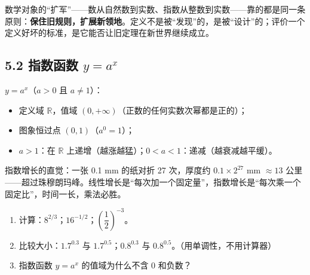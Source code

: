 \documentclass[UTF8,a4paper,11pt]{ctexart}
\begin{document}
\begin{calcbox}[数学推广的第一性原理]
数学对象的“扩军”——数从自然数到实数、指数从整数到实数——靠的都是同一条原则：\textbf{保住旧规则，扩展新领地}。定义不是被“发现”的，是被“设计”的；评价一个定义好坏的标准，是它能否让旧定理在新世界继续成立。
\end{calcbox}

\subsection*{5.2 指数函数 $y = a^x$}

\begin{keyconcept}[指数函数及其性质]
$y = a^x$（$a > 0$ 且 $a \neq 1$）：
\begin{itemize}
  \item 定义域 $\mathbb{R}$，值域 $(0, +\infty)$（正数的任何实数次幂都是正的）；
  \item 图象恒过点 $(0, 1)$（$a^0 = 1$）；
  \item $a > 1$：在 $\mathbb{R}$ 上递增（越涨越猛）；$0 < a < 1$：递减（越衰减越平缓）。
\end{itemize}
\end{keyconcept}

\begin{center}
\end{center}

指数增长的直觉：一张 0.1 mm 的纸对折 27 次，厚度约 $0.1 \times 2^{27}$ mm $\approx 13$ 公里——超过珠穆朗玛峰。线性增长是“每次加一个固定量”，指数增长是“每次乘一个固定比”，时间一长，乘法必胜。

\begin{exercise}[今日自测]
\begin{enumerate}
  \item 计算：$8^{2/3}$；$16^{-1/2}$；$\left(\dfrac{1}{2}\right)^{-3}$。
  \item 比较大小：$1.7^{0.3}$ 与 $1.7^{0.5}$；$0.8^{0.3}$ 与 $0.8^{0.5}$。（用单调性，不用计算器）
  \item 指数函数 $y = a^x$ 的值域为什么不含 0 和负数？
\end{enumerate}
\end{exercise}
\end{document}
